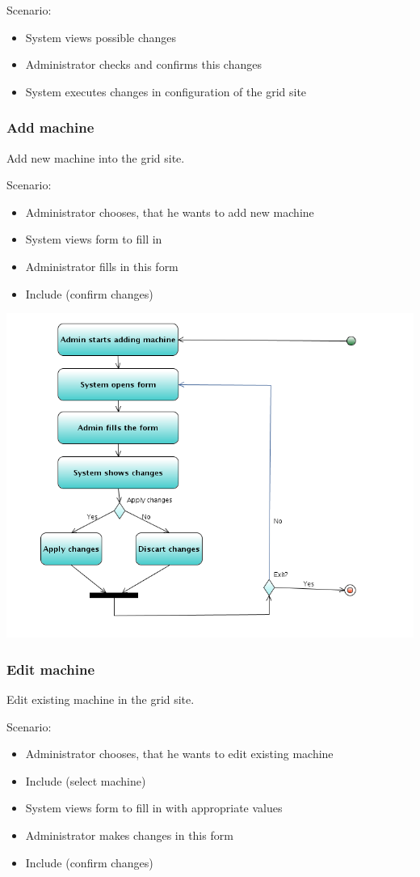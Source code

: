 \documentclass{article}
\begin{document}
Scenario:
\begin{itemize}
\item{System views possible changes}
\item{Administrator checks and confirms this changes}
\item{System executes changes in configuration of the grid site}
\end{itemize}

\subsubsection{Add machine}
Add new machine into the grid site.

Scenario:
\begin{itemize}
\item{Administrator chooses, that he wants to add new machine}
\item{System views form to fill in}
\item{Administrator fills in this form}
\item{Include (confirm changes)}
\end{itemize}

\includegraphics[width=\linewidth]{AddM.png}


\subsubsection{Edit machine}
Edit existing machine in the grid site.

Scenario:
\begin{itemize}
\item{Administrator chooses, that he wants to edit existing machine}
\item{Include (select machine)}
\item{System views form to fill in with appropriate values}
\item{Administrator makes changes in this form}
\item{Include (confirm changes)}
\end{itemize}
\end{document}
